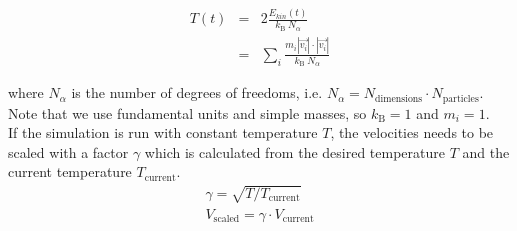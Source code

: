 \documentclass{article}
\begin{document}
\begin{eqnarray}
    T(t) &=& 2 \frac{E_{kin}(t)}{k_\mathrm{B} \ N_\alpha }\\
         &=& \sum_i \frac{m_i|\vec{v_i}| \cdot |\vec{v_i}|}{k_\mathrm{B} \ N_\alpha}
\end{eqnarray}

where $N_\alpha$ is the number of degrees of freedoms, i.e. $N_\alpha = N_{\mathrm{dimensions}} \cdot N_{\mathrm{particles}}$. Note that we use fundamental units and simple masses, so $k_\mathrm{B} = 1$ and $m_i = 1$.\\

If the simulation is run with constant temperature $T$, the velocities needs to be scaled with a factor $\gamma$ which is calculated from the desired temperature $T$ and the current temperature $T_\mathrm{current}$.
\begin{eqnarray}
    \gamma = \sqrt{T/T_\mathrm{current}}\\
    \label{eq:temp_factor}
    V_\mathrm{scaled} = \gamma \cdot V_\mathrm{current}
\end{eqnarray}

% 


%
%
%
%
%
%
\end{document}
